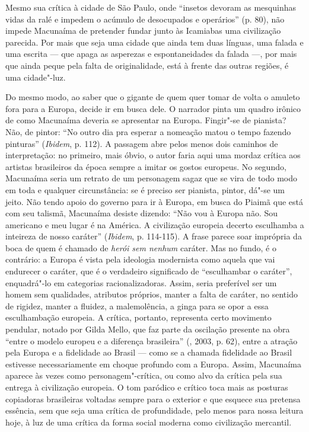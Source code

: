 Mesmo sua crítica à cidade de São Paulo, onde ``insetos devoram as
mesquinhas vidas da ralé e impedem o acúmulo de desocupados e
operários'' (p. 80), não impede Macunaíma de pretender fundar junto às
Icamiabas uma civilização parecida. Por mais que seja uma cidade que
ainda tem duas línguas, uma falada e uma escrita --- que apaga as
asperezas e espontaneidades da falada ---, por mais que ainda peque pela
falta de originalidade, está à frente das outras regiões, é uma
cidade"-luz.

Do mesmo modo, ao saber que o gigante de quem quer tomar de volta o
amuleto fora para a Europa, decide ir em busca dele. O narrador pinta um
quadro irônico de como Macunaíma deveria se apresentar na Europa.
Fingir"-se de pianista? Não, de pintor: ``No outro dia pra esperar a
nomeação matou o tempo fazendo pinturas'' (\emph{Ibidem}, p. 112). A
passagem abre pelos menos dois caminhos de interpretação: no primeiro,
mais óbvio, o autor faria aqui uma mordaz crítica aos artistas
brasileiros da época sempre a imitar os gostos europeus. No segundo,
Macunaíma seria um retrato de um personagem sagaz que se vira de todo
modo em toda e qualquer circunstância: se é preciso ser pianista,
pintor, dá"-se um jeito. Não tendo apoio do governo para ir à Europa, em
busca do Piaimã que está com seu talismã, Macunaíma desiste dizendo:
``Não vou à Europa não. Sou americano e meu lugar é na América. A
civilização europeia decerto esculhamba a inteireza de nosso caráter''
(\emph{Ibidem}, p. 114-115). A frase parece soar imprópria da boca de
quem é chamado de \emph{herói sem nenhum} caráter. Mas no fundo, é o
contrário: a Europa é vista pela ideologia modernista como aquela que
vai endurecer o caráter, que é o verdadeiro significado de ``esculhambar
o caráter'', enquadrá"-lo em categorias racionalizadoras. Assim, seria
preferível ser um homem sem qualidades, atributos próprios, manter a
falta de caráter, no sentido de rigidez, manter a
fluidez, a malemolência, a ginga para se opor a essa esculhambação
europeia. A crítica, portanto, representa certo movimento pendular,
notado por Gilda Mello, que faz parte da oscilação presente na obra
``entre o modelo europeu e a diferença brasileira'' (, 2003, p.
62), entre a atração pela Europa e a fidelidade ao Brasil --- como se a
chamada fidelidade ao Brasil estivesse necessariamente em choque
profundo com a Europa. Assim, Macunaíma aparece às vezes como
personagem"-crítica, ou como alvo da crítica pela sua entrega à
civilização europeia. O tom paródico e crítico toca mais as posturas
copiadoras brasileiras voltadas sempre para o exterior e que esquece sua
pretensa essência, sem que seja uma crítica de profundidade, pelo menos
para nossa leitura hoje, à luz de uma crítica da forma social moderna
como civilização mercantil.

